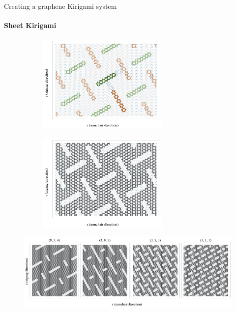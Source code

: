 \documentclass[
	10pt, %
]{beamer}
\begin{document}
%
%
\begin{frame}{Creating a graphene Kirigami system}
	\framesubtitle{Sheet Kirigami}
	

	\begin{figure}[H]
		\centering
		\begin{subfigure}[t]{0.49\textwidth}
			\centering
			\raggedleft
			\includegraphics[width=0.7\textwidth]{../thesis/figures/system/pop_up_inverse.pdf}
		  \end{subfigure}
		  \hfill
		  \begin{subfigure}[t]{0.49\textwidth}
			\centering
			\raggedright
			\includegraphics[width=0.7\textwidth]{../thesis/figures/system/pop_up_pattern.pdf}
		\end{subfigure}

	  \end{figure}
	  
	  
	  \begin{figure}[H]
		\centering
		\includegraphics[width=\linewidth]{../thesis/figures/system/pop_up_flavors.pdf}
	  \end{figure}
	  
\end{frame}
\end{document}
